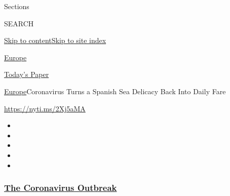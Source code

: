 Sections

SEARCH

\protect\hyperlink{site-content}{Skip to
content}\protect\hyperlink{site-index}{Skip to site index}

\href{https://www.nytimes3xbfgragh.onion/section/world/europe}{Europe}

\href{https://myaccount.nytimes3xbfgragh.onion/auth/login?response_type=cookie\&client_id=vi}{}

\href{https://www.nytimes3xbfgragh.onion/section/todayspaper}{Today's
Paper}

\href{/section/world/europe}{Europe}\textbar{}Coronavirus Turns a
Spanish Sea Delicacy Back Into Daily Fare

\url{https://nyti.ms/2Xj5aMA}

\begin{itemize}
\item
\item
\item
\item
\item
\end{itemize}

\hypertarget{the-coronavirus-outbreak}{%
\subsubsection{\texorpdfstring{\href{https://www.nytimes3xbfgragh.onion/news-event/coronavirus?name=styln-coronavirus-national\&region=TOP_BANNER\&block=storyline_menu_recirc\&action=click\&pgtype=Article\&impression_id=f55c9370-f4be-11ea-bb8b-6f96f58b56bb\&variant=undefined}{The
Coronavirus
Outbreak}}{The Coronavirus Outbreak}}\label{the-coronavirus-outbreak}}

